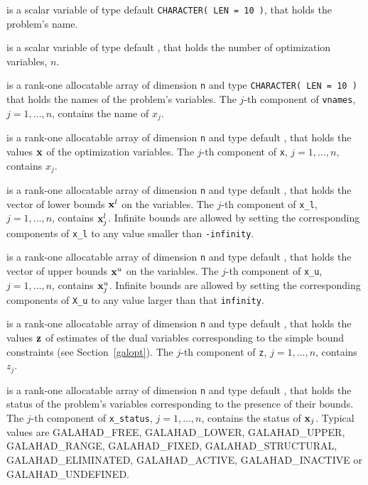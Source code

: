 \documentclass{galahad}
\newcommand{\sym}{\sf\small}
\begin{document}
\begin{description}
 is a scalar variable of type default {\tt CHARACTER( LEN = 10 )},
that holds the problem's name.

 is a scalar variable of type default \integer,
 that holds the number of optimization variables, $n$.

 is a rank-one allocatable array of dimension {\tt n} and type
{\tt CHARACTER( LEN = 10 )} that holds the names of the problem's
variables. The $j$-th component of {\tt vnames}, $j = 1,  \ldots , n$,
contains the name of $x_{j}$.

 is a rank-one allocatable array of dimension {\tt n} and type
default \realdp,
that holds the values ${\mathbf{x}}$ of the optimization variables.
The $j$-th component of {\tt x}, $j = 1,  \ldots , n$, contains $x_{j}$.

 is a rank-one allocatable array of dimension {\tt n} and type
default \realdp, that holds
the vector of lower bounds ${\mathbf{x}}^{l}$ on the variables.
The $j$-th component of {\tt x\_l}, $j = 1, \ldots , n$,
contains ${\mathbf{x}}_{j}^{l}$.
Infinite bounds are allowed by setting the corresponding
components of {\tt x\_l} to any value smaller than {\tt -infinity}.

 is a rank-one allocatable array of dimension {\tt n} and type
default \realdp, that holds
the vector of upper bounds ${\mathbf{x}}^{u}$ on the variables.
The $j$-th component of {\tt x\_u}, $j = 1, \ldots , n$,
contains ${\mathbf{x}}_{j}^{u}$.
Infinite bounds are allowed by setting the corresponding
components of {\tt X\_u} to any value larger than that {\tt infinity}.

 is a rank-one allocatable array of dimension {\tt n} and type default
\realdp, that holds
the values ${\mathbf{z}}$ of estimates  of the dual variables
corresponding to the simple bound constraints (see Section~\ref{galopt}).
The $j$-th component of {\tt z}, $j = 1,  \ldots ,  n$, contains $z_{j}$.

 is  a rank-one allocatable array of dimension {\tt n} and type
default \integer, that holds the status of the problem's variables
corresponding to the presence of their bounds. The $j$-th component of
{\tt x\_status}, $j = 1,  \ldots ,  n$, contains the status of ${\mathbf{x}}_j$.
Typical values are
{\sym GALAHAD\_FREE},  {\sym GALAHAD\_LOWER}, {\sym GALAHAD\_UPPER},
{\sym GALAHAD\_RANGE}, {\sym GALAHAD\_FIXED}, {\sym GALAHAD\_STRUCTURAL},
{\sym GALAHAD\_ELIMINATED}, {\sym GALAHAD\_ACTIVE},
{\sym GALAHAD\_INACTIVE} or {\sym GALAHAD\_UNDEFINED}.


\end{description}
\end{document}
